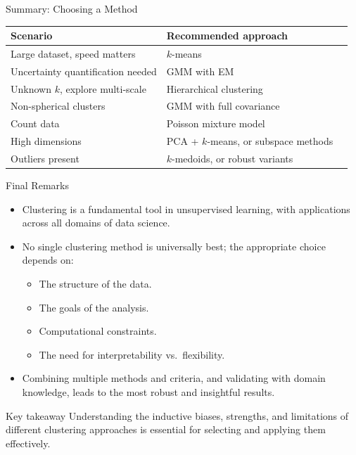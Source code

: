 \begin{frame}{Summary: Choosing a Method}
  \renewcommand{\arraystretch}{1.4}
  \begin{center}
  \begin{tabular}{lll}
    \toprule
    \textbf{Scenario} & \textbf{Recommended approach} \\
    \midrule
    Large dataset, speed matters & $k$-means \\
    Uncertainty quantification needed & GMM with EM \\
    Unknown $k$, explore multi-scale & Hierarchical clustering \\
    Non-spherical clusters & GMM with full covariance \\
    Count data & Poisson mixture model \\
    High dimensions & PCA + $k$-means, or subspace methods \\
    Outliers present & $k$-medoids, or robust variants \\
    \bottomrule
  \end{tabular}
  \end{center}
\end{frame}

\begin{frame}{Final Remarks}
  \begin{itemize}
    \item Clustering is a fundamental tool in unsupervised learning, with applications
          across all domains of data science.
    \item No single clustering method is universally best; the appropriate choice depends
          on:
      \begin{itemize}
        \item The structure of the data.
        \item The goals of the analysis.
        \item Computational constraints.
        \item The need for interpretability vs.\ flexibility.
      \end{itemize}
    \item Combining multiple methods and criteria, and validating with domain knowledge,
          leads to the most robust and insightful results.
  \end{itemize}
  \begin{block}{Key takeaway}
    Understanding the inductive biases, strengths, and limitations of different clustering
    approaches is essential for selecting and applying them effectively.
  \end{block}
\end{frame}

%

